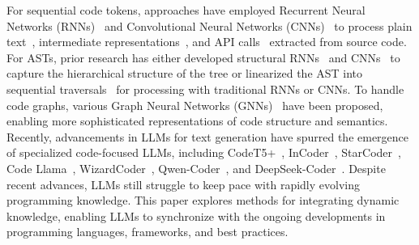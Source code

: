 For sequential code tokens, approaches have employed Recurrent Neural Networks (RNNs)~\cite{graves2012long,chung2015gated,gu2018deep} and Convolutional Neural Networks (CNNs)~\cite{mou2016convolutional, yamashita2018convolutional} to process plain text~\cite{iyer2016summarizing,allamanis2016convolutional}, intermediate representations~\cite{venkatakeerthy2019ir2vec,peng2021how,gui2022cross}, and API calls~\cite{gu2016deep,nguyen2017exploring} extracted from source code. For ASTs, prior research has either developed structural RNNs~\cite{wan2018improving} and CNNs~\cite{mou2016convolutional} to capture the hierarchical structure of the tree or linearized the AST into sequential traversals~\cite{alon2019code2vec,alon2018code2seq} for processing with traditional RNNs or CNNs. To handle code graphs, various Graph Neural Networks (GNNs)~\cite{chu2024graph,allamanis2017learning} have been proposed, enabling more sophisticated representations of code structure and semantics.
Recently, advancements in LLMs for text generation have spurred the emergence of specialized code-focused LLMs, including CodeT5+~\cite{wang2023codet5+}, InCoder~\cite{fried2022incoder}, StarCoder~\cite{Li2023StarCoderMT}, Code Llama~\cite{Roziere2023codellama}, WizardCoder~\cite{luo2023wizardcoder}, Qwen-Coder~\cite{hui2024qwen2.5coder}, and DeepSeek-Coder~\cite{guo2024deepseek}. 
Despite recent advances, LLMs still struggle to keep pace with rapidly evolving programming knowledge. This paper explores methods for integrating dynamic knowledge, enabling LLMs to synchronize with the ongoing developments in programming languages, frameworks, and best practices.



